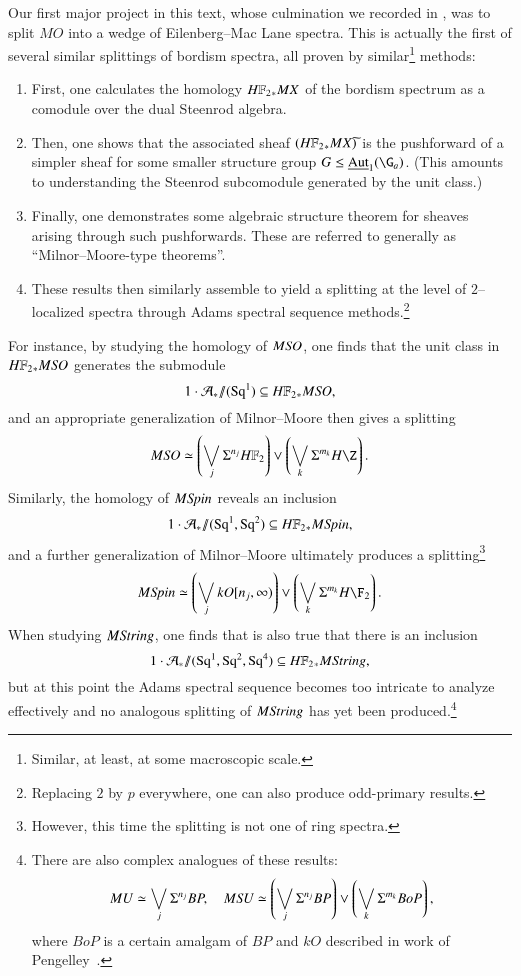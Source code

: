 Our first major project in this text, whose culmination we recorded in , was to split $MO$ into a wedge of Eilenberg--Mac Lane spectra.  This is actually the first of several similar splittings of bordism spectra, all proven by similar\footnote{Similar, at least, at some macroscopic scale.} methods:
\begin{enumerate}
    \item First, one calculates the homology $\HFtwo_* MX$ of the bordism spectrum as a comodule over the dual Steenrod algebra.
    \item Then, one shows that the associated sheaf $(\HFtwo_* MX)\widetilde{}$ is the pushforward of a simpler sheaf for some smaller structure group $G \le \InternalAut_1(\G_a)$.  (This amounts to understanding the Steenrod subcomodule generated by the unit class.)
    \item Finally, one demonstrates some algebraic structure theorem for sheaves arising through such pushforwards.  These are referred to generally as ``Milnor--Moore-type theorems''.
    \item These results then similarly assemble to yield a splitting at the level of $2$--localized spectra through Adams spectral sequence methods.\footnote{Replacing $2$ by $p$ everywhere, one can also produce odd-primary results.}
\end{enumerate}

For instance, by studying the homology of $M\mathit{SO}$, one finds that the unit class in $\HFtwo_* M\SO$ generates the submodule \[1 \cdot \mathcal A_* \mmod (\Sq^1) \subseteq \HFtwo_* M\SO,\] and an appropriate generalization of Milnor--Moore then gives a splitting \[M\SO \simeq \left( \bigvee_j \Susp^{n_j} \HFtwo \right) \vee \left( \bigvee_k \Susp^{m_k} H\Z \right).\]  Similarly, the homology of $M\mathit{Spin}$ reveals an inclusion~\cite{ABP,GiambalvoPengelley} \[1 \cdot \mathcal A_* \mmod (\Sq^1, \Sq^2) \subseteq \HFtwo_* M\Spin,\] and a further generalization of Milnor--Moore ultimately produces a splitting\footnote{However, this time the splitting is not one of ring spectra.} \[M\Spin \simeq \left( \bigvee_j kO[n_j, \infty)\right) \vee \left( \bigvee_k \Susp^{m_k} H\F_2 \right).\]  When studying $M\mathit{String}$, one finds that is also true that there is an inclusion \[1 \cdot \mathcal A_* \mmod (\Sq^1, \Sq^2, \Sq^4) \subseteq \HFtwo_* M\String,\] but at this point the Adams spectral sequence becomes too intricate to analyze effectively and no analogous splitting of $M\mathit{String}$ has yet been produced.\footnote{There are also complex analogues of these results:
\[
MU \simeq \bigvee_j \Sigma^{n_j} BP, \quad
M\mathit{SU} \simeq \left(\bigvee_j \Sigma^{n_j} BP\right) \vee \left(\bigvee_k \Sigma^{m_k} BoP \right),
\]
where $BoP$ is a certain amalgam of $BP$ and $kO$ described in work of Pengelley~\cite{Pengelley}.}

